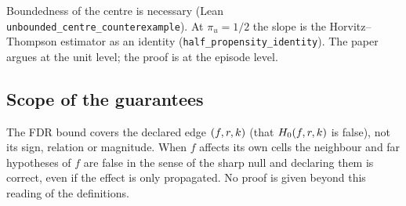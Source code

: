 \noindent Boundedness of the centre is necessary (Lean \texttt{unbounded\_centre\_counterexample}). At $\pi_u = 1/2$ the slope is the Horvitz--Thompson estimator as an identity (\texttt{half\_propensity\_identity}). The paper argues at the unit level; the proof is at the episode level.


\subsection{Scope of the guarantees}
\label{spec:thm.scope}

The FDR bound covers the declared edge $(f, r, k)$ (that $H_0(f, r, k)$ is false), not its sign, relation or magnitude. When $f$ affects its own cells the neighbour and far hypotheses of $f$ are false in the sense of the sharp null and declaring them is correct, even if the effect is only propagated. No proof is given beyond this reading of the definitions.

